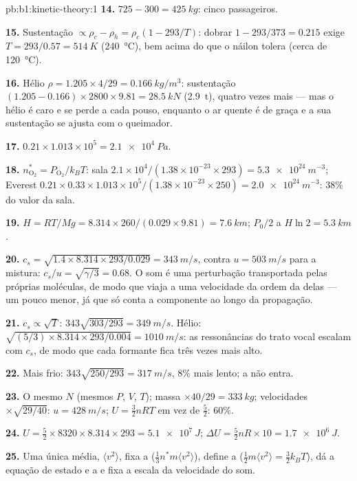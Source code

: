 \begin{solution}{pb:b1:kinetic-theory:1}
\textbf{14.} $725 - 300 = \qty{425}{kg}$: cinco passageiros.

\textbf{15.} Sustentação $\propto \rho_c - \rho_h = \rho_c(1 - 293/T)$: dobrar
$1 - 293/373 = 0.215$ exige $T = 293/0.57 = \qty{514}{K}$ (\qty{240}{\degreeCelsius}),
bem acima do que o náilon tolera (cerca de \qty{120}{\degreeCelsius}).

\textbf{16.} Hélio $\rho = 1.205 \times 4/29 = \qty{0.166}{kg/m^3}$: sustentação
$(1.205 - 0.166) \times 2800 \times 9.81 = \qty{28.5}{kN}$ (\qty{2.9}{t}), quatro
vezes mais --- mas o hélio é caro e se perde a cada pouso, enquanto o ar
quente é de graça e a sua sustentação se ajusta com o queimador.

\textbf{17.} $0.21 \times 1.013\times10^5 = \qty{2.1e4}{Pa}$.

\textbf{18.} $n^*_{\mathrm{O}_2} = P_{\mathrm{O}_2}/k_BT$: sala $2.1\times10^4/
(1.38\times10^{-23} \times 293) = \qty{5.3e24}{m^{-3}}$; Everest $0.21 \times 0.33
\times 1.013\times10^5/(1.38\times10^{-23} \times 250) = \qty{2.0e24}{m^{-3}}$:
$38\%$ do valor da sala.

\textbf{19.} $H = RT/Mg = 8.314 \times 260/(0.029 \times 9.81) = \qty{7.6}{km}$;
$P_0/2$ a $H\ln 2 = \qty{5.3}{km}$.

\textbf{20.} $c_s = \sqrt{1.4 \times 8.314 \times 293/0.029} = \qty{343}{m/s}$,
contra $u = \qty{503}{m/s}$ para a mistura: $c_s/u = \sqrt{\gamma/3} = 0.68$.
O som é uma perturbação transportada pelas próprias moléculas, de modo que
viaja a uma velocidade da ordem da delas --- um pouco menor, já que
só conta a componente ao longo da propagação.

\textbf{21.} $c_s \propto \sqrt T$: $343\sqrt{303/293} = \qty{349}{m/s}$.
Hélio: $\sqrt{(5/3) \times 8.314 \times 293/0.004} = \qty{1010}{m/s}$: as
ressonâncias do trato vocal escalam com $c_s$, de modo que cada formante
fica três vezes mais alto.

\textbf{22.} Mais frio: $343\sqrt{250/293} = \qty{317}{m/s}$, $8\%$ mais lento;
a  não entra.

\textbf{23.} O mesmo $N$ (mesmos $P$, $V$, $T$); massa $\times 40/29 = \qty{333}{kg}$;
velocidades $\times\sqrt{29/40}$: $u = \qty{428}{m/s}$; $U = \tfrac32 nRT$ em vez de
$\tfrac52$: $60\%$.

\textbf{24.} $U = \tfrac52 \times 8320 \times 8.314 \times 293 = \qty{5.1e7}{J}$;
$\Delta U = \tfrac52 nR \times 10 = \qty{1.7e6}{J}$.

\textbf{25.} Uma única média, $\langle v^2\rangle$, fixa a 
($\tfrac13 n^*m\langle v^2\rangle$), define a 
($\tfrac12 m\langle v^2\rangle = \tfrac32 k_BT$), dá a equação de estado
e a  e fixa a escala da velocidade do som.
\end{solution}

